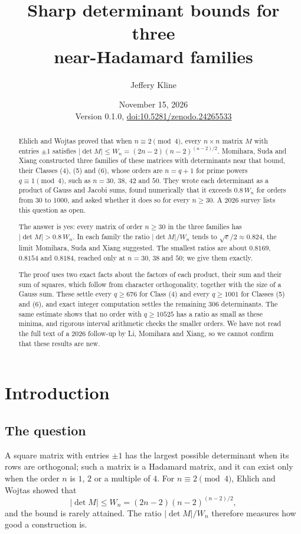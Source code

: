 \documentclass[11pt]{article}
\title{Sharp determinant bounds for three\\ near-Hadamard families}
\author{Jeffery Kline}
\date{November 15, 2026\\[3pt]\small Version 0.1.0, \href{https://doi.org/10.5281/zenodo.24265533}{doi:10.5281/zenodo.24265533}}
\newcommand{\abs}[1]{\lvert#1\rvert}
\begin{document}
\maketitle

\begin{abstract}
Ehlich and Wojtas proved that when $n\equiv2\pmod4$, every $n\times n$
matrix $M$ with entries $\pm1$ satisfies
$\abs{\det M}\le W_n=(2n-2)(n-2)^{(n-2)/2}$. Momihara, Suda and Xiang
constructed three families of these matrices with determinants near that
bound, their Classes (4), (5) and (6), whose orders are $n=q+1$ for prime
powers $q\equiv1\pmod4$, such as $n=30$, $38$, $42$ and $50$. They wrote
each determinant as a product of Gauss and Jacobi sums, found numerically
that it exceeds $0.8\,W_n$ for orders from $30$ to $1000$, and asked
whether it does so for every $n\ge30$. A 2026 survey lists this question as open.

The answer is yes: every matrix of order $n\ge30$ in the three families
has $\abs{\det M}>0.8\,W_n$. In each family the ratio $\abs{\det M}/W_n$
tends to $\sqrt e/2\approx0.824$, the limit Momihara, Suda and Xiang
suggested. The smallest ratios are about $0.8169$, $0.8154$ and
$0.8184$, reached only at $n=30$, $38$ and $50$; we give them exactly.

The proof uses two exact facts about the factors of each product, their
sum and their sum of squares, which follow from character orthogonality,
together with the size of a Gauss sum. These settle every $q\ge676$ for
Class (4) and every $q\ge1001$ for Classes (5) and (6), and exact integer
computation settles the remaining 306 determinants. The same estimate
shows that no order with $q\ge10525$ has a ratio as small as these
minima, and rigorous interval arithmetic checks the smaller orders. We
have not read the full text of a 2026 follow-up by Li, Momihara and
Xiang, so we cannot confirm that these results are new.
\end{abstract}

\section{Introduction}\label{sec:intro}

\subsection{The question}
A square matrix with entries $\pm1$ has the largest possible determinant
when its rows are orthogonal; such a matrix is a Hadamard matrix, and it
can exist only when the order $n$ is $1$, $2$ or a multiple of $4$. For
$n\equiv2\pmod4$, Ehlich and Wojtas showed that
\begin{equation}\label{eq:EW}
 \abs{\det M}\le W_n=(2n-2)(n-2)^{(n-2)/2},
\end{equation}
and the bound is rarely attained. The ratio $\abs{\det M}/W_n$ therefore
measures how good a construction is.
\end{document}
